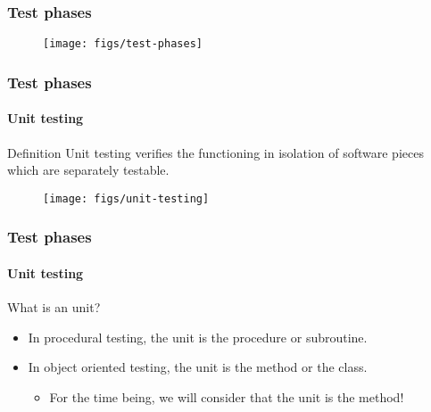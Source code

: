 \begin{frame}[c]
\frametitle{Test phases}

\begin{figure}
    \centering
    \texttt{[image: figs/test-phases]}
\end{figure}
\end{frame}


\begin{frame}
\frametitle{Test phases}
\framesubtitle{Unit testing}
\label{concept:unit-testing}

\begin{block:concept}{Definition}
Unit testing verifies the functioning in isolation of software pieces which
are separately testable.
\end{block:concept}

\begin{figure}
    \centering
    \texttt{[image: figs/unit-testing]}
\end{figure}

\hfill
{}
\end{frame}


\begin{frame}
\frametitle{Test phases}
\framesubtitle{Unit testing}

\begin{block:fact}{What is an unit?}
\begin{itemize}
	\item In procedural testing, the unit is the procedure or subroutine.

	\item In object oriented testing, the unit is the method or the class.
	\begin{itemize}
		\item For the time being, we will consider that the unit is the method!
	\end{itemize}
\end{itemize}
\end{block:fact}
\end{frame}



